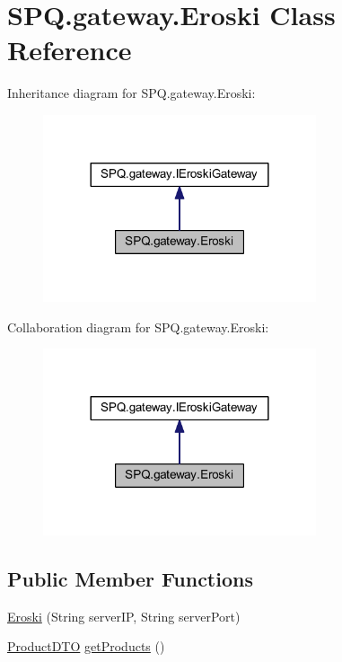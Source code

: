 \hypertarget{class_s_p_q_1_1gateway_1_1_eroski}{}\section{S\+P\+Q.\+gateway.\+Eroski Class Reference}
\label{class_s_p_q_1_1gateway_1_1_eroski}


Inheritance diagram for S\+P\+Q.\+gateway.\+Eroski\+:
\nopagebreak
\begin{figure}[H]
\begin{center}
\leavevmode
\includegraphics[width=228pt]{class_s_p_q_1_1gateway_1_1_eroski__inherit__graph}
\end{center}
\end{figure}


Collaboration diagram for S\+P\+Q.\+gateway.\+Eroski\+:
\nopagebreak
\begin{figure}[H]
\begin{center}
\leavevmode
\includegraphics[width=228pt]{class_s_p_q_1_1gateway_1_1_eroski__coll__graph}
\end{center}
\end{figure}
\subsection*{Public Member Functions}
\begin{DoxyCompactItemize}
\item 
\mbox{\hyperlink{class_s_p_q_1_1gateway_1_1_eroski_a3cc7f464fb202689cf62501ffb5ede18}{Eroski}} (String server\+IP, String server\+Port)
\item 
\mbox{\hyperlink{class_s_p_q_1_1dto_1_1_product_d_t_o}{Product\+D\+TO}} \mbox{\hyperlink{class_s_p_q_1_1gateway_1_1_eroski_acfd174565206c16fb55489786957b8de}{get\+Products}} ()
\end{DoxyCompactItemize}


